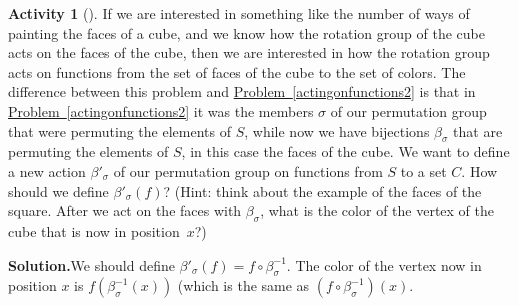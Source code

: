 \documentclass[10pt,]{book}
\theoremstyle{plain}
\theoremstyle{definition}
\newtheorem{activity}[project]{Activity}
\numberwithin{equation}{chapter}
\begin{document}
\begin{activity}[]\label{actingonfunctions3}
If we are interested in something like the number of ways of painting the faces of a cube, and we know how the rotation group of the cube acts on the faces of the cube, then we are interested in how the rotation group acts on functions from the set of faces of the cube to the set of colors. The difference between this problem and \hyperref[actingonfunctions2]{Problem~\ref{actingonfunctions2}} is that in \hyperref[actingonfunctions2]{Problem~\ref{actingonfunctions2}} it was the members \(\sigma\) of our permutation group that were permuting the elements of \(S\), while now we have bijections \(\beta_{\sigma}\) that are permuting the elements of \(S\), in this case the faces of the cube. We want to define a new action \(\beta'_{\sigma}\) of our permutation group on functions from \(S\) to a set \(C\). How should we define \(\beta'_{\sigma}(f)\)? (Hint: think about the example of the faces of the square. After we act on the faces with \(\beta_{\sigma}\), what is the color of the vertex of the cube that is now in position~\(x\)?)%
\par\medskip\noindent%
\textbf{Solution.}\quad We should define \(\beta'_{\sigma}(f) = f\circ
\beta_{\sigma}^{-1}\). The color of the vertex now in position \(x\) is \(f(\beta_{\sigma}^{-1}(x))\) (which is the same as \((f\circ\beta_{\sigma}^{-1})(x)\).%
\end{activity}
\typeout{************************************************}
\typeout{************************************************}
\end{document}

